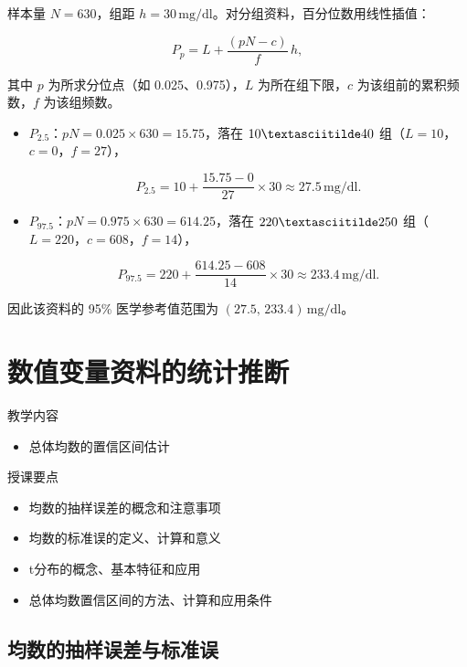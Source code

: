\documentclass[lang=cn,10pt]{elegantbook}
\begin{document}
\vspace{0.2cm}
\begin{solution}
样本量 $N=630$，组距 $h=30\,\mathrm{mg/dl}$。对分组资料，百分位数用线性插值：

\[
P_p=L+\frac{\left(pN-c\right)}{f}\,h,
\]

其中 $p$ 为所求分位点（如 0.025、0.975），$L$ 为所在组下限，$c$ 为该组前的累积频数，$f$ 为该组频数。

\begin{itemize}
\item $P_{2.5}$：$pN=0.025\times 630=15.75$，落在 $10\textasciitilde 40$ 组（$L=10$，$c=0$，$f=27$），

\[
P_{2.5}=10+\frac{15.75-0}{27}\times 30\approx 27.5\,\mathrm{mg/dl}.
\]

\item $P_{97.5}$：$pN=0.975\times 630=614.25$，落在 $220\textasciitilde 250$ 组（$L=220$，$c=608$，$f=14$），

\[
P_{97.5}=220+\frac{614.25-608}{14}\times 30\approx 233.4\,\mathrm{mg/dl}.
\]

\end{itemize}

因此该资料的 95\% 医学参考值范围为 $\left(27.5,\,233.4\right)\,\mathrm{mg/dl}$。
\end{solution}

\chapter{数值变量资料的统计推断}

\begin{introduction}
    \item 教学内容
    \begin{itemize}
        \item 总体均数的置信区间估计
    \end{itemize}
    \item 授课要点
    \begin{itemize}
        \item 均数的抽样误差的概念和注意事项
        \item 均数的标准误的定义、计算和意义
        \item t分布的概念、基本特征和应用
        \item 总体均数置信区间的方法、计算和应用条件
    \end{itemize}
\end{introduction}


\section{均数的抽样误差与标准误}
\end{document}
